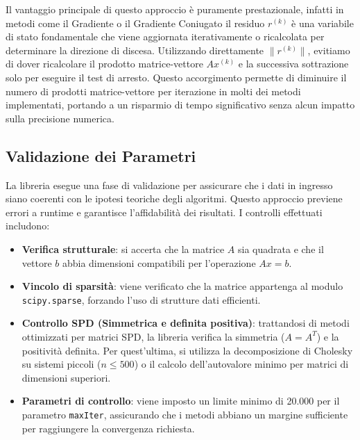 \documentclass[a4paper, 12pt]{report}
\begin{document}
\noindent Il vantaggio principale di questo approccio è puramente prestazionale, infatti in metodi come il Gradiente o il Gradiente Coniugato il residuo $r^{(k)}$ è una variabile di stato fondamentale che viene aggiornata iterativamente o ricalcolata per determinare la direzione di discesa. Utilizzando direttamente $\|r^{(k)}\|$, evitiamo di dover ricalcolare il prodotto matrice-vettore $Ax^{(k)}$ e la successiva sottrazione solo per eseguire il test di arresto. Questo accorgimento permette di diminuire il numero di prodotti matrice-vettore per iterazione in molti dei metodi implementati, portando a un risparmio di tempo significativo senza alcun impatto sulla precisione numerica.


\subsection{Validazione dei Parametri}
La libreria esegue una fase di validazione per assicurare che i dati in ingresso siano coerenti con le ipotesi teoriche degli algoritmi. Questo approccio previene errori a runtime e garantisce l'affidabilità dei risultati. I controlli effettuati includono:
\begin{itemize}
    \item \textbf{Verifica strutturale}: si accerta che la matrice $A$ sia quadrata e che il vettore $b$ abbia dimensioni compatibili per l'operazione $Ax = b$.
    \item \textbf{Vincolo di sparsità}: viene verificato che la matrice appartenga al modulo \texttt{scipy.sparse}, forzando l'uso di strutture dati efficienti.
    \item \textbf{Controllo SPD (Simmetrica e definita positiva)}: trattandosi di metodi ottimizzati per matrici SPD, la libreria verifica la simmetria ($A = A^T$) e la positività definita. Per quest'ultima, si utilizza la decomposizione di Cholesky su sistemi piccoli ($n \le 500$) o il calcolo dell'autovalore minimo per matrici di dimensioni superiori.
    \item \textbf{Parametri di controllo}: viene imposto un limite minimo di 20.000 per il parametro \texttt{maxIter}, assicurando che i metodi abbiano un margine sufficiente per raggiungere la convergenza richiesta.
\end{itemize}
\end{document}
